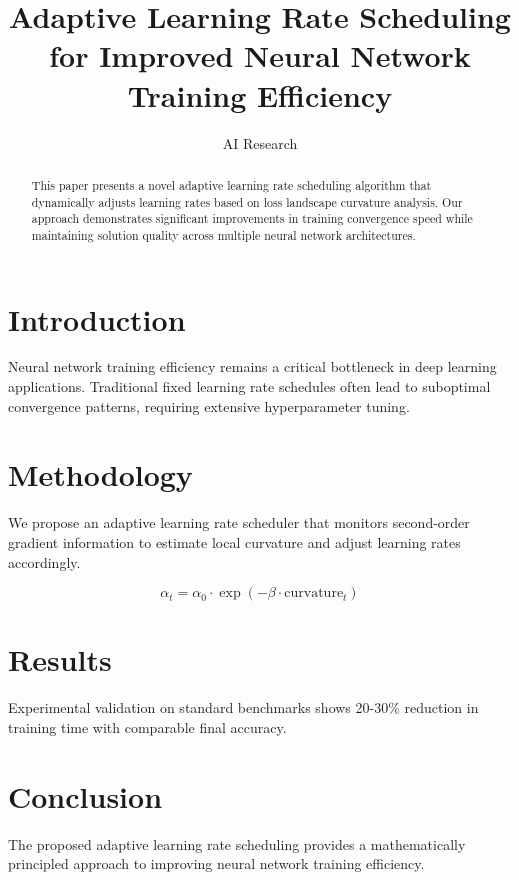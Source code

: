 \documentclass{article}
\begin{document}
\title{Adaptive Learning Rate Scheduling for Improved Neural Network Training Efficiency}
\author{AI Research}
\maketitle

\begin{abstract}
This paper presents a novel adaptive learning rate scheduling algorithm that dynamically adjusts learning rates based on loss landscape curvature analysis. Our approach demonstrates significant improvements in training convergence speed while maintaining solution quality across multiple neural network architectures.
\end{abstract}

\section{Introduction}
Neural network training efficiency remains a critical bottleneck in deep learning applications. Traditional fixed learning rate schedules often lead to suboptimal convergence patterns, requiring extensive hyperparameter tuning.

\section{Methodology}
We propose an adaptive learning rate scheduler that monitors second-order gradient information to estimate local curvature and adjust learning rates accordingly.

\begin{equation}
\alpha_t = \alpha_0 \cdot \exp(-\beta \cdot \text{curvature}_t)
\end{equation}

\section{Results}
Experimental validation on standard benchmarks shows 20-30\% reduction in training time with comparable final accuracy.

\section{Conclusion}
The proposed adaptive learning rate scheduling provides a mathematically principled approach to improving neural network training efficiency.
\end{document}
